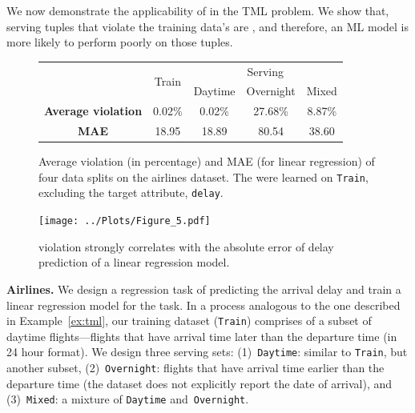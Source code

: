  We now demonstrate the applicability of \dis in the TML problem.
We show that, serving tuples that violate the training data's \dis are \nc, and
therefore, an ML model is more likely to perform poorly on those tuples.


\smallskip

\begin{figure}[t!]
	\centering
	\setlength{\tabcolsep}{5pt}
	\renewcommand\arraystretch{0.88}
	\small{
	\begin{tabular}{ccccc}
		\hline
		&  \multirow{ 2}{*}{Train} & \multicolumn{3}{c}{Serving}\\
		\cline{3-5}
		&& Daytime & Overnight & Mixed \\
		\midrule
		\textbf{Average violation} & 0.02\% & 0.02\% & 27.68\% & 8.87\%\\
		\textbf{MAE} & 18.95	 &  18.89 & 80.54 & 38.60\\
		\bottomrule
		
	\end{tabular}
	}
		\vspace{-3mm}	
	 \caption{Average \invariant violation (in percentage) and MAE (for linear regression) 
	 of four data splits on the airlines dataset. The \invariants were learned on
 	 \texttt{Train}, excluding the target attribute, \texttt{delay}.}
	 
	\label{fig:airlines-summary}
	\vspace{2mm}
	\centering
	\texttt{[image: ../Plots/Figure\_5.pdf]}
	\vspace{-3mm}	
	\caption{\Invariant violation strongly correlates with the absolute error
	 of delay prediction of a linear regression model.}
	 \vspace{2mm}	
	\label{fig:airlines}
\end{figure}


\noindent \textbf{Airlines.} We design a regression task of predicting the
arrival delay and train a linear regression model for the task.  In
a process analogous to the one described in Example~\ref{ex:tml}, our training
dataset (\texttt{Train}) comprises of a subset of daytime flights---flights
that have arrival time later than the departure time (in 24 hour format). We
design three serving sets: (1)~\texttt{Daytime}: similar to \texttt{Train}, but
another subset, (2)~\texttt{Overnight}: flights that have arrival time earlier
than the departure time (the dataset does not explicitly report the date of
arrival), and (3)~\texttt{Mixed}: a mixture of \texttt{Daytime}
and~\texttt{Overnight}. 

